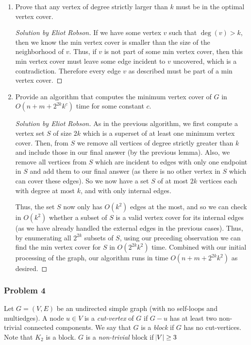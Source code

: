 \documentclass{article}
\newenvironment{solution}[1]{\begin{proof}[Solution by #1]}{\end{proof}}
\begin{document}
\begin{enumerate}
    \item Prove that any vertex of degree strictly larger than \(k\) must be in the optimal vertex cover.
    
    \begin{solution}{Eliot Robson}
        If we have some vertex \(v\) such that \(\deg(v) > k\), then we know the min vertex cover is smaller than the size of the neighborhood of \(v\). Thus, if \(v\) is not part of some min vertex cover, then this min vertex cover must leave some edge incident to \(v\) uncovered, which is a contradiction. Therefore every edge \(v\) as described must be part of a min vertex cover.
    \end{solution}

    \item Provide an algorithm that computes the minimum vertex cover of \(G\) in \(O(n + m + 2^{2k} k^c)\) time for some constant \(c\).
    
    \begin{solution}{Eliot Robson}
        As in the previous algorithm, we first compute a vertex set \(S\) of size \(2k\) which is a superset of at least one minimum vertex cover. Then, from \(S\) we remove all vertices of degree strictly greater than \(k\) and include those in our final answer (by the previous lemma). Also, we remove all vertices from \(S\) which are incident to edges with only one endpoint in \(S\) and add them to our final answer (as there is no other vertex in \(S\) which can cover these edges). So we now have a set \(S\) of at most \(2k\) vertices each with degree at most \(k\), and with only internal edges.
        
        Thus, the set \(S\) now only has \(O(k^2)\) edges at the most, and so we can check in \(O(k^2)\) whether a subset of \(S\) is a valid vertex cover for its internal edges (as we have already handled the external edges in the previous cases). Thus, by enumerating all \(2^{2k}\) subsets of \(S\), using our preceding observation we can find the min vertex cover for \(S\) in \(O(2^{2k} k^{2})\) time. Combined with our initial processing of the graph, our algorithm runs in time \(O(n + m + 2^{2k} k^2)\) as desired.
    \end{solution}
\end{enumerate}


\subsubsection{Problem 4}
Let \(G = (V,E)\) be an undirected simple graph (with no self-loops and multiedges). A node \(u \in V\) is a \emph{cut-vertex} of \(G\) if \(G - u\) has at least two non-trivial connected components. We say that \(G\) is a \emph{block} if \(G\) has no cut-vertices. Note that \(K_2\) is a block. \(G\) is a \emph{non-trivial} block if \(\abs{V} \geq 3\)
\end{document}

